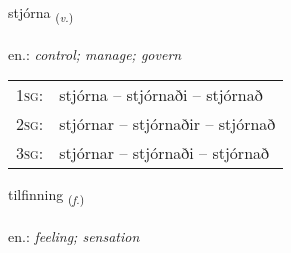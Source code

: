 \documentclass[frontgrid, backgrid]{flacards}\usepackage[]{graphicx}\usepackage[]{xcolor}
\begin{document}
\renewcommand{\flhead}{\vskip5pt \fboxsep=0pt {\small\bfseries\footnotesize Sagnorð | Verb}}
\renewcommand{\fcfoot}{\vskip5pt \fboxsep=0pt \hspace{2pt}{\small\bfseries\footnotesize 1K}}

\renewcommand{\blhead}{\vskip5pt {\small\bfseries\footnotesize Sagnorð | Verb }}
\renewcommand{\bcfoot}{\vskip5pt \hspace{2pt}{\small\bfseries\footnotesize 1K}}


{stjórna \small{\textsubscript{(\textit{v.})}} \\[1ex] %
\textphonetic{[stjourtna]} \\
en.: \emph{control; manage; govern} \\  [2ex]
\renewcommand*{\arraystretch}{0.8}
\begin{tabular}{p{1cm}l}
\textsc{1sg}: & stjórna -- stjórnaði -- stjórnað \\ 
\textsc{2sg}: & stjórnar -- stjórnaðir -- stjórnað \\ 
\textsc{3sg}: & stjórnar -- stjórnaði -- stjórnað \\ 
\end{tabular}
}

\renewcommand{\flhead}{\vskip5pt \fboxsep=0pt {\small\bfseries\footnotesize Nafnorð | Noun}}
\renewcommand{\fcfoot}{\vskip5pt \fboxsep=0pt \hspace{2pt}{\small\bfseries\footnotesize 1K}}

\renewcommand{\blhead}{\vskip5pt {\small\bfseries\footnotesize Nafnorð | Noun }}
\renewcommand{\bcfoot}{\vskip5pt \hspace{2pt}{\small\bfseries\footnotesize 1K}}


{tilfinning \small{\textsubscript{(\textit{f.})}} \\[1ex] %
\textphonetic{[tʰɪlfɪniŋk]} \\
en.: \emph{feeling; sensation} \\  [2ex]
\renewcommand*{\arraystretch}{0.8}
}
\end{document}
